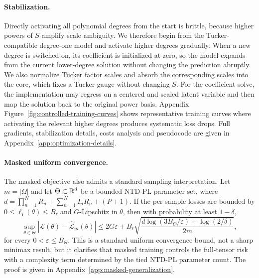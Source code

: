\paragraph{Stabilization.}
Directly activating all polynomial degrees from the start is brittle, because
higher powers of \(S\) amplify scale ambiguity. We therefore begin from the
Tucker-compatible degree-one model and activate higher degrees gradually. When
a new degree is switched on, its coefficient is initialized at zero, so the
model expands from the current lower-degree solution without changing the
prediction abruptly. We also normalize Tucker factor scales and absorb the
corresponding scales into the core, which fixes a Tucker gauge without
changing \(S\). For the coefficient solve, the implementation may regress on a
centered and scaled latent variable and then map the solution back to the
original power basis. Appendix Figure~\ref{fig:controlled-training-curves}
shows representative training curves where activating the relevant higher
degrees produces systematic loss drops. Full gradients, stabilization details, costs analysis and pseudocode are given in Appendix~\ref{app:optimization-details}.

\paragraph{Masked uniform convergence.}
The masked objective also admits a standard sampling interpretation. Let
\(m=|\Omega|\) and let \(\Theta\subset\mathbb{R}^d\) be a bounded NTD-PL parameter
set, where \(d=\prod_{n=1}^{N}R_n+\sum_{n=1}^{N}I_nR_n+(P+1)\). If the
per-sample losses are bounded by \(0\le \ell_{\mathbf i}(\theta)\le B_\ell\)
and \(G\)-Lipschitz in \(\theta\), then with probability at least \(1-\delta\),
\begin{equation}
  \sup_{\theta\in\Theta}
  \left|
  \mathcal L(\theta)-\widehat{\mathcal L}_{m}(\theta)
  \right|
  \le
  2G\varepsilon
  +
  B_\ell
  \sqrt{
  \frac{
  d\log(3B_\Theta/\varepsilon)+\log(2/\delta)}
  {2m}},
\end{equation}
for every \(0<\varepsilon\le B_\Theta\). This is a standard uniform
convergence bound, not a sharp minimax result, but it clarifies that masked
training controls the full-tensor risk with a complexity term determined by the
tied NTD-PL parameter count. The proof is given in
Appendix~\ref{app:masked-generalization}.

